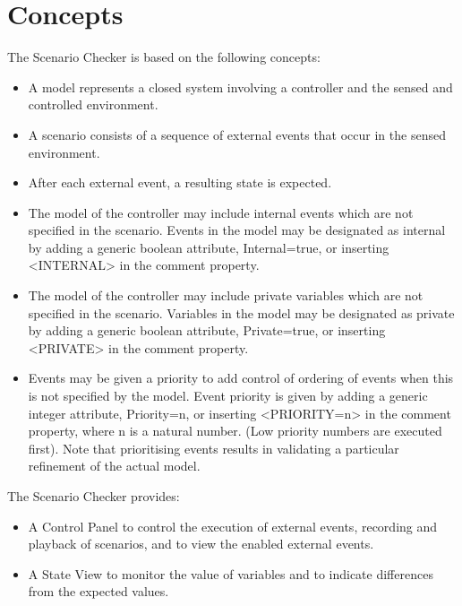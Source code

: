 
\section{Concepts}
\label{sec:concepts}

The Scenario Checker is based on the following concepts:
\begin{itemize}
		\item A model represents a closed system involving a controller and the sensed and controlled environment.
		\item A scenario consists of a sequence of external events that occur in the sensed environment. 
		\item After each external event, a resulting state is expected.
		\item The model of the controller may include internal events which are not specified in the scenario. 
		Events in the model may be designated as internal by adding a generic boolean attribute, Internal=true, or inserting <INTERNAL> in the comment property.
		\item The model of the controller may include private variables which are not specified in the scenario.
		Variables in the model may be designated as private by adding a generic boolean attribute, Private=true, or inserting <PRIVATE> in the comment property.
		\item Events may be given a priority to add control of ordering of events when this is not specified by the model. 
		Event priority is given by adding a generic integer attribute, Priority=n, or inserting <PRIORITY=n> in the comment property, where n is a natural number.
		(Low priority numbers are executed first).
		Note that prioritising events results in validating a particular refinement of the actual model.
\end{itemize}
	
The Scenario Checker provides:
\begin{itemize}
	\item A Control Panel to control the execution of external events, recording and playback of scenarios, and to view the enabled external events.
	\item A State View to monitor the value of variables and to indicate differences from the expected values.
\end{itemize}


